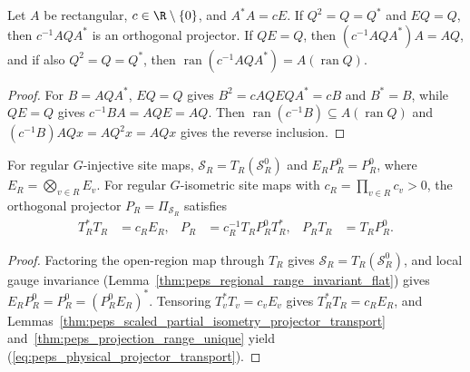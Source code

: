 \begin{lemma}%
    \label{thm:peps_scaled_partial_isometry_projector_transport}
    \leanok
    Let $A$ be rectangular, $c\in\R\setminus\{0\}$, and $A^*A=cE$.
    If $Q^2=Q=Q^*$ and $EQ=Q$, then $c^{-1}AQA^*$ is an orthogonal projector.
    If $QE=Q$, then $(c^{-1}AQA^*)A=AQ$, and if also $Q^2=Q=Q^*$, then
    $\operatorname{ran}(c^{-1}AQA^*)=A(\operatorname{ran}Q)$.
\end{lemma}
\begin{proof}\leanok
    For $B=AQA^*$, $EQ=Q$ gives $B^2=cAQEQA^*=cB$ and $B^*=B$, while $QE=Q$
    gives $c^{-1}BA=AQE=AQ$. Then $\operatorname{ran}(c^{-1}B)\subseteq A(\operatorname{ran}Q)$
    and $(c^{-1}B)AQx=AQ^2x=AQx$ gives the reverse inclusion.
\end{proof}

\begin{lemma}%
    \label{thm:peps_physical_regional_projector}
    \leanok
    For regular $G$-injective site maps, $\mathcal S_R=T_R(\mathcal S_R^0)$ and
    $E_RP_R^0=P_R^0$, where $E_R=\bigotimes_{v\in R}E_v$.
    For regular $G$-isometric site maps with $c_R=\prod_{v\in R}c_v>0$, the
    orthogonal projector $P_R=\Pi_{\mathcal S_R}$ satisfies
    \begin{align}
        T_R^*T_R & =c_RE_R,                &
        P_R      & =c_R^{-1}T_RP_R^0T_R^*, &
        P_RT_R   & =T_RP_R^0.
        \label{eq:peps_physical_projector_transport}
    \end{align}
\end{lemma}
\begin{proof}\leanok
    Factoring the open-region map through $T_R$ gives $\mathcal S_R=T_R(\mathcal S_R^0)$,
    and local gauge invariance (Lemma~\ref{thm:peps_regional_range_invariant_flat})
    gives $E_RP_R^0=P_R^0=(P_R^0E_R)^*$. Tensoring $T_v^*T_v=c_vE_v$ gives
    $T_R^*T_R=c_RE_R$, and Lemmas~\ref{thm:peps_scaled_partial_isometry_projector_transport}
    and~\ref{thm:peps_projection_range_unique} yield (\ref{eq:peps_physical_projector_transport}).
\end{proof}

